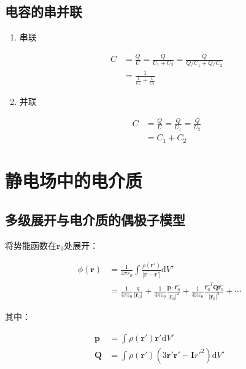 \documentclass[12pt,onecolumn,a4paper]{book}
\numberwithin{table}{subsection}
\numberwithin{equation}{subsection}
\begin{document}
\subsection{电容的串并联}

\begin{enumerate}
    \item 串联

          \begin{align}
              C & = \frac{Q}{U} = \frac{Q}{U_1+U_2} = \frac{Q}{Q/C_1+Q/C_2} \\
                & = \frac{1}{\frac{1}{C_1}+\frac{1}{C_2}}
          \end{align}

    \item 并联

          \begin{align}
              C & = \frac{Q}{U} = \frac{Q}{U_1} = \frac{Q}{U_2} \\
                & = C_1+C_2
          \end{align}
\end{enumerate}

\section{静电场中的电介质}

\subsection{多级展开与电介质的偶极子模型}

将势能函数在$\mathbf{r}_0$处展开：

\begin{align}
    \phi(\mathbf{r}) & = \frac{1}{4 \pi \varepsilon_0} \int \frac{\rho(\mathbf{r}')}{|\mathbf{r}-\mathbf{r}'|} \mathrm{d} V'                                                                                                                                                                         \\
                     & = \frac{1}{4 \pi \varepsilon_0} \frac{q}{|\mathbf{r}_0 |} + \frac{1}{4 \pi \varepsilon_0} \frac{\mathbf{p} \cdot \hat{\mathbf{r}_0}}{|\mathbf{r}_0 |^2} + \frac{1}{4 \pi \varepsilon_0} \frac{\hat{\mathbf{r}_0}^T \mathbf{Q} \hat{\mathbf{r}_0}}{|\mathbf{r}_0 |^3} + \cdots
\end{align}

其中：

\begin{align}
    \mathbf{p} & = \int \rho(\mathbf{r}') \mathbf{r}' \mathrm{d} V'                                  \\
    \mathbf{Q} & = \int \rho(\mathbf{r}') (3\mathbf{r}' \mathbf{r}' - \mathbf{I} r'^2) \mathrm{d} V'
\end{align}
\end{document}

